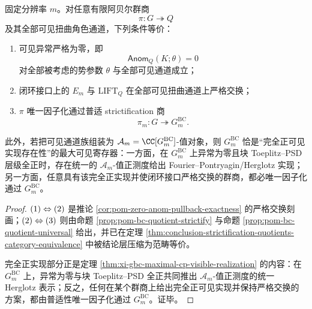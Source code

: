 \begin{theorem}\label{thm:conclusion-zero-anomaly-maximal-visible-cp-realization}
固定分辨率 \(m\)。对任意有限阿贝尔群商
\[
\pi:G\twoheadrightarrow Q
\]
及其全部可见扭曲角色通道，下列条件等价：
\begin{enumerate}
  \item 可见异常严格为零，即
  \[
  \mathsf{Anom}_Q(K;\theta)=0
  \]
  对全部被考虑的势参数 \(\theta\) 与全部可见通道成立；
  \item 闭环接口上的 \(E_m\) 与 \(\mathrm{LIFT}_Q\) 在全部可见扭曲通道上严格交换；
  \item \(\pi\) 唯一因子化通过普适 strictification 商
  \[
  \pi_m:G\twoheadrightarrow G_m^{\mathrm{BC}}.
  \]
\end{enumerate}
此外，若把可见通道族组装为 \(\mathcal A_m=\CC[G_m^{\mathrm{BC}}]\)-值对象，则 \(G_m^{\mathrm{BC}}\) 恰是“完全正可见实现存在性”的最大可见寄存器：一方面，在 \(G_m^{\mathrm{BC}}\) 上异常为零且块 Toeplitz--PSD 层级全正时，存在统一的 \(\mathcal A_m\)-值正测度给出 Fourier--Pontryagin/Herglotz 实现；另一方面，任意具有该完全正实现并使闭环接口严格交换的群商，都必唯一因子化通过 \(G_m^{\mathrm{BC}}\)。
\end{theorem}
\begin{proof}
\(\textup{(1)}\Leftrightarrow\textup{(2)}\) 是推论 \ref{cor:pom-zero-anom-pullback-exactness} 的严格交换刻画；\(\textup{(2)}\Leftrightarrow\textup{(3)}\) 则由命题 \ref{prop:pom-bc-quotient-strictify} 与命题 \ref{prop:pom-bc-quotient-universal} 给出，并已在定理 \ref{thm:conclusion-strictification-quotients-category-equivalence} 中被结论层压缩为范畴等价。

完全正实现部分正是定理 \ref{thm:xi-gbc-maximal-cp-visible-realization} 的内容：在 \(G_m^{\mathrm{BC}}\) 上，异常为零与块 Toeplitz--PSD 全正共同推出 \(\mathcal A_m\)-值正测度的统一 Herglotz 表示；反之，任何在某个群商上给出完全正可见实现并保持严格交换的方案，都由普适性唯一因子化通过 \(G_m^{\mathrm{BC}}\)。证毕。
\end{proof}

